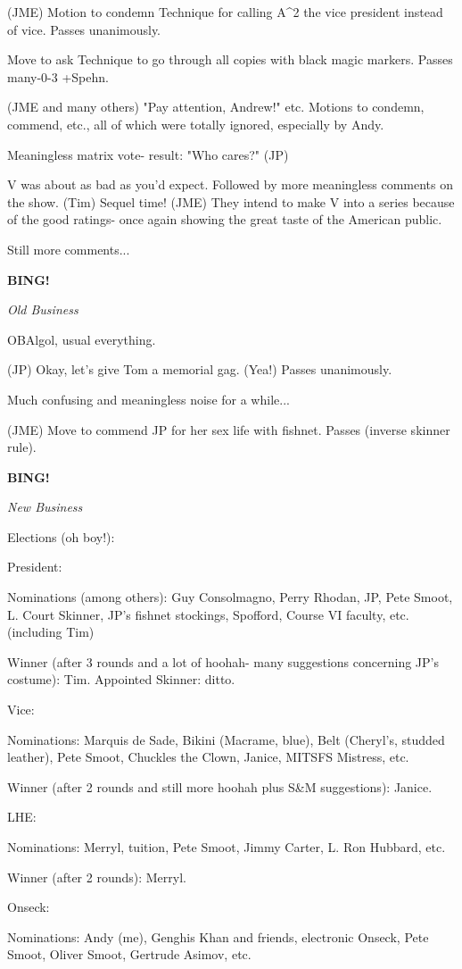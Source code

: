 \documentclass[12pt]{article}
\newcommand{\bing}{{\bf BING!} }
\newcommand{\goto}[1]{\bing \vskip 12pt \centerline{{\em{#1}}}}
\begin{document}
(JME) Motion to condemn Technique for calling A^2 the vice president instead of vice. Passes unanimously.

Move to ask Technique to go through all copies with black magic markers. Passes many-0-3 +Spehn.

(JME and many others) "Pay attention, Andrew!" etc. Motions to condemn, commend, etc., all of which were totally ignored, especially by Andy.

Meaningless matrix vote- result: "Who cares?" (JP)

V was about as bad as you'd expect. Followed by more meaningless comments on the show. (Tim) Sequel time! (JME) They intend to make V into a series because of the good ratings- once again showing the great taste of the American public.

Still more comments...

\goto{Old Business}

OBAlgol, usual everything.

(JP) Okay, let's give Tom a memorial gag. (Yea!) Passes unanimously.

Much confusing and meaningless noise for a while...

(JME) Move to commend JP for her sex life with fishnet. Passes (inverse skinner rule).

\goto{New Business}

Elections (oh boy!):

President:

Nominations (among others): Guy Consolmagno, Perry Rhodan, JP, Pete Smoot, L. Court Skinner, JP's fishnet stockings, Spofford, Course VI faculty, etc. (including Tim)

Winner (after 3 rounds and a lot of hoohah- many suggestions concerning JP's costume): Tim. Appointed Skinner: ditto.

Vice:

Nominations: Marquis de Sade, Bikini (Macrame, blue), Belt (Cheryl's, studded leather), Pete Smoot, Chuckles the Clown, Janice, MITSFS Mistress, etc.

Winner (after 2 rounds and still more hoohah plus S&M suggestions): Janice.

LHE:

Nominations: Merryl, tuition, Pete Smoot, Jimmy Carter, L. Ron Hubbard, etc.

Winner (after 2 rounds): Merryl.

Onseck:

Nominations: Andy (me), Genghis Khan and friends, electronic Onseck, Pete Smoot, Oliver Smoot, Gertrude Asimov, etc.
\end{document}
